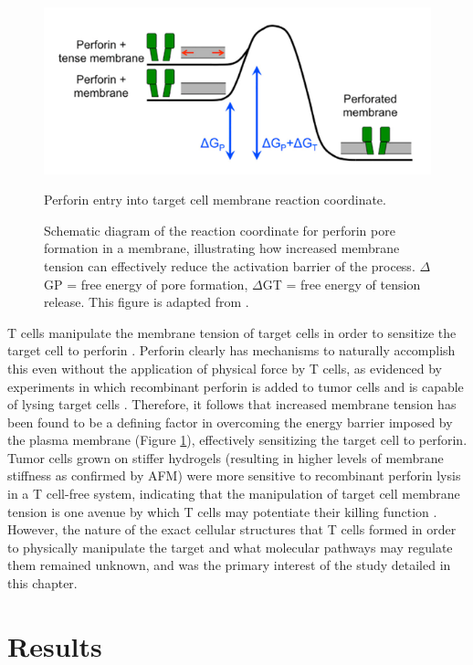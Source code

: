 \begin{figure}[htbp]
	\centering
	\includegraphics[width=\textwidth]{../figures/chapter2/reactioncoordinate.png}
	\caption{Perforin entry into target cell membrane reaction coordinate.}
	\caption*{Schematic diagram of the reaction coordinate for perforin pore formation in a membrane, illustrating how increased membrane tension can effectively reduce the activation barrier of the process. $\Delta$GP = free energy of pore formation, $\Delta$GT = free energy of tension release. This figure is adapted from \cite{Basu2016}.}
	\label{fig:reactioncoordinate}
\end{figure}

T cells manipulate the membrane tension of target cells in order to sensitize the target cell to perforin \cite{Basu2016}. Perforin clearly has mechanisms to naturally accomplish this \cite{Law2010} even without the application of physical force by T cells, as evidenced by experiments in which recombinant perforin is added to tumor cells and is capable of lysing target cells \cite{Basu2016}. Therefore, it follows that increased membrane tension has been found to be a defining factor in overcoming the energy barrier imposed by the plasma membrane (Figure \ref{fig:reactioncoordinate}), effectively sensitizing the target cell to perforin. Tumor cells grown on stiffer hydrogels (resulting in higher levels of membrane stiffness as confirmed by AFM) were more sensitive to recombinant perforin lysis in a T cell-free system, indicating that the manipulation of target cell membrane tension is one avenue by which T cells may potentiate their killing function \cite{Basu2016}. However, the nature of the exact cellular structures that T cells formed in order to physically manipulate the target and what molecular pathways may regulate them remained unknown, and was the primary interest of the study detailed in this chapter.

\section{Results} 

